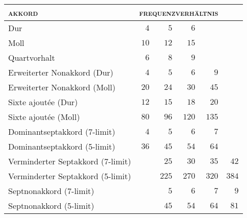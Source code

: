 \begin{table}
  \centering
  \begin{tabular}{lrrrrr}
    \toprule
    \textsc{akkord} & \multicolumn{4}{l}{\textsc{frequenzverhältnis}}\\
    \midrule
    Dur                               & $4$  & $5$   & $6$                   \\
    Moll                              & $10$ & $12$  & $15$                  \\
    Quartvorhalt                      & $6$  & $8$   & $9$                   \\
    Erweiterter Nonakkord (Dur)       & $4$  & $5$   & $6$    & $9$          \\
    Erweiterter Nonakkord (Moll)      & $20$ & $24$  & $30$   & $45$         \\
    Sixte ajoutée (Dur)               & $12$ & $15$  & $18$   & $20$         \\
    Sixte ajoutée (Moll)              & $80$ & $96$  & $120$  & $135$        \\
    Dominantseptakkord (7-limit)      & $4$  & $5$   & $6$    & $7$          \\
    Dominantseptakkord (5-limit)      & $36$ & $45$  & $54$   & $64$         \\
    Verminderter Septakkord (7-limit) &      & $25$  & $30$   & $35$  & $42$ \\
    Verminderter Septakkord (5-limit) &      & $225$ & $270$  & $320$ & $384$\\
    Septnonakkord (7-limit)           &      & $5$   & $6$    & $7$   & $9$  \\
    Septnonakkord (5-limit)           &      & $45$  & $54$   & $64$  & $81$ \\
    \bottomrule
  \end{tabular}
\end{table}

